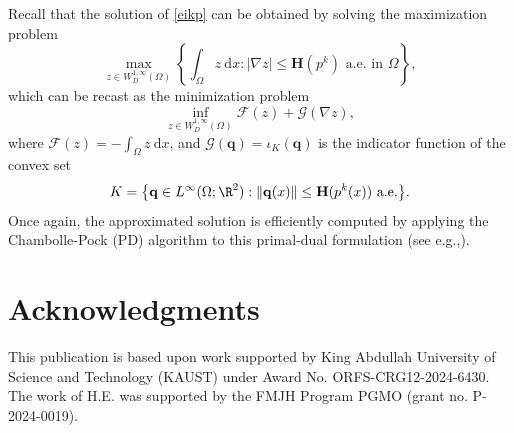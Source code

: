 \documentclass[final,reqno]{amsart}
\theoremstyle{plain}
\theoremstyle{definition}
\theoremstyle{remark}
\numberwithin{remark}{section}	%
\numberwithin{example}{section}	%
\newcommand{\he}{\mathbf{H}}
\newcommand{\Om}{\Omega}
\newcommand{\eg}{e.g.,\xspace}	%
\newcommand{\dd}{\mathrm{d}}
\newcommand{\I}{\iota}
\begin{document}
Recall that the solution of \eqref{eikp} can be obtained by solving the maximization problem
\begin{equation}
	\label{vitesse2}
	\max_{z \in W^{1,\infty}_D(\Om)}\left\{  \int_\Omega  z \: \dd x  : \vert  \nabla z\vert \leq \he(p^k) \mbox{ a.e. in } \Omega  \right\},
\end{equation}
which can be recast as the minimization problem
\begin{equation}
	\inf_{z \in  W^{1,\infty}_{D}(\Om) } \mathcal{F}(z)+ \mathcal{G} (\nabla z),
\end{equation}
where $\mathcal{F}(z) = - \int_\Omega  z \: \dd x$, and $\mathcal{G}(\mathbf{q}) = \I_K(\mathbf{q})$ is the indicator function of the convex set 
\[
K = \big\{\mathbf{q} \in L^\infty(\Omega; \R^2) : \Vert \mathbf{q}(x)\Vert \leq \he(p^k(x)) \mbox{ a.e.} \big\}.
\]
Once again, the approximated solution is efficiently computed by applying the Chambolle-Pock (PD) algorithm to this primal-dual formulation (see \eg  \cite{EQE}).

\section*{Acknowledgments}

This publication is based upon work supported by King Abdullah University of Science and Technology (KAUST) under Award No. ORFS-CRG12-2024-6430. The work of H.E. was supported by the FMJH Program PGMO (grant no. P-2024-0019).




\end{document}
